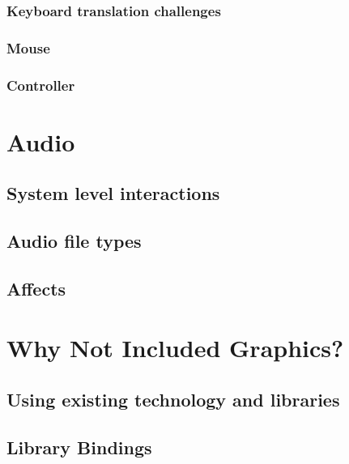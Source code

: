 \documentclass[11pt, letterpaper]{article}
\begin{document}
\subsubsection{Keyboard translation challenges}
\blindtext
\subsubsection{Mouse}
\blindtext
\subsubsection{Controller}
\blindtext

\section{Audio}
\subsection{System level interactions}
\subsection{Audio file types}
\subsection{Affects}

\section{Why Not Included Graphics?}
\subsection{Using existing technology and libraries}
\subsection{Library Bindings}
\end{document}
